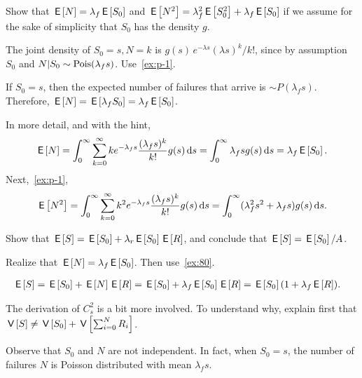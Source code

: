 \begin{exercise}\label{ex:f-3}
Show
that $\,\mathsf{E}\left[N\right] = \lambda_f \,\mathsf{E}\left[S_0\right]$ and $\,\mathsf{E}\left[N^2\right] = \lambda_f^2 \,\mathsf{E}\left[S_0^2\right] + \lambda_f \,\mathsf{E}\left[S_0\right]$
if we assume for the sake of simplicity that $S_0$ has the density $g$.
\begin{hint}
  The joint density of $S_0=s, N=k$ is $g(s)\, e^{-\lambda s}(\lambda s)^k/{k!}$, since by assumption $S_0$ and $N| S_{0}\sim \mathrm{Pois}(\lambda_{f} s)$.
  Use~\cref{ex:p-1}.
\end{hint}
\begin{solution}
  If $S_0=s$, then the expected number of failures that arrive is $\sim P(\lambda_f s)$.
  Therefore, $\,\mathsf{E}\left[N\right] = \,\mathsf{E}\left[\lambda_f S_0\right] = \lambda_f \,\mathsf{E}\left[S_0\right]$.

  In more detail, and with the hint,
  \begin{equation*}
    \,\mathsf{E}\left[N\right] = \int_0^\infty \sum_{k=0}^\infty k e^{-\lambda_f s}\frac{(\lambda_f s)^k}{k!} g(s) \,\textrm{d}s = \int_0^\infty \lambda_f s g(s) \,\textrm{d}s = \lambda_f \,\mathsf{E}\left[S_0\right].
  \end{equation*}
Next,~\cref{ex:p-1},
  \begin{equation*}
    \,\mathsf{E}\left[N^2\right] = \int_0^\infty \sum_{k=0}^\infty k^2 e^{-\lambda_f s}\frac{(\lambda_f s)^k}{k!} g(s) \,\textrm{d}s = \int_0^\infty (\lambda_f^2 s^2 + \lambda_f s) g(s) \,\textrm{d}s.
  \end{equation*}
\end{solution}
\end{exercise}


\begin{exercise}\label{ex:f-16}
 Show that $\,\mathsf{E}\left[S\right] = \,\mathsf{E}\left[S_0\right] + \lambda_r \,\mathsf{E}\left[S_0\right] \,\mathsf{E}\left[R\right]$, and  conclude that $\,\mathsf{E}\left[S\right] = \,\mathsf{E}\left[S_0\right]/A$.
\begin{hint}
 Realize that $\,\mathsf{E}\left[N\right] = \lambda_f \,\mathsf{E}\left[S_0\right]$. Then use~\cref{ex:80}.
\end{hint}
\begin{solution}
 \begin{align*}
   \,\mathsf{E}\left[S\right] &= \,\mathsf{E}\left[S_0\right] + \,\mathsf{E}\left[N\right] \,\mathsf{E}\left[R\right] = \,\mathsf{E}\left[S_0\right] + \lambda_f \,\mathsf{E}\left[S_0\right] \,\mathsf{E}\left[R\right]= \,\mathsf{E}\left[S_0\right](1+\lambda_f \,\mathsf{E}\left[R\right]).
 \end{align*}
\end{solution}
\end{exercise}


\begin{exercise}\label{ex:l-159}
 The derivation of $C_s^2$ is a bit more involved.
To understand why,  explain first that $\,\mathsf{V}\left[S\right] \neq \,\mathsf{V}\left[S_0\right] + \,\mathsf{V}\left[\sum_{i=0}^N R_i\right]$.
\begin{solution}
 Observe that $S_0$ and $N$ are not independent. In fact, when $S_0=s$, the number of failures $N$ is Poisson distributed with mean $\lambda_f s$.
\end{solution}
\end{exercise}



